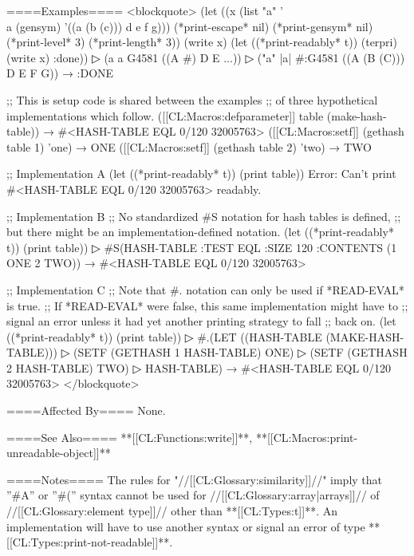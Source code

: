 ====Examples====
<blockquote> (let ((x (list "a" '\\a (gensym) '((a (b (c))) d e f g))) (*print-escape* nil) (*print-gensym* nil) (*print-level* 3) (*print-length* 3)) (write x) (let ((*print-readably* t)) (terpri) (write x) :done))
▷ (a a G4581 ((A #) D E ...))
▷ ("a" |a| #:G4581 ((A (B (C))) D E F G)) → :DONE

;; This is setup code is shared between the examples ;; of three hypothetical implementations which follow. ([[CL:Macros:defparameter]] table (make-hash-table)) → #<HASH-TABLE EQL 0/120 32005763> ([[CL:Macros:setf]] (gethash table 1) 'one) → ONE ([[CL:Macros:setf]] (gethash table 2) 'two) → TWO

;; Implementation A (let ((*print-readably* t)) (print table)) Error: Can't print #<HASH-TABLE EQL 0/120 32005763> readably.

;; Implementation B ;; No standardized #S notation for hash tables is defined, ;; but there might be an implementation-defined notation. (let ((*print-readably* t)) (print table))
▷ #S(HASH-TABLE :TEST EQL :SIZE 120 :CONTENTS (1 ONE 2 TWO)) → #<HASH-TABLE EQL 0/120 32005763>

;; Implementation C ;; Note that #. notation can only be used if *READ-EVAL* is true. ;; If *READ-EVAL* were false, this same implementation might have to ;; signal an error unless it had yet another printing strategy to fall ;; back on. (let ((*print-readably* t)) (print table))
▷ #.(LET ((HASH-TABLE (MAKE-HASH-TABLE)))
▷ (SETF (GETHASH 1 HASH-TABLE) ONE)
▷ (SETF (GETHASH 2 HASH-TABLE) TWO)
▷ HASH-TABLE) → #<HASH-TABLE EQL 0/120 32005763> </blockquote>

====Affected By====
None.

====See Also====
**[[CL:Functions:write]]**, **[[CL:Macros:print-unreadable-object]]**

====Notes====
The rules for "//[[CL:Glossary:similarity]]//" imply that ''#A'' or ''#('' syntax cannot be used for //[[CL:Glossary:array|arrays]]// of //[[CL:Glossary:element type]]// other than **[[CL:Types:t]]**. An implementation will have to use another syntax or signal an error of type **[[CL:Types:print-not-readable]]**.

  
